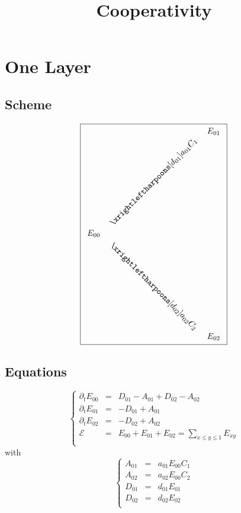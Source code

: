 \documentclass[aps,onecolumn,12pt]{revtex4}
\begin{document}
\title{Cooperativity}
\maketitle

\section{One Layer}

\subsection{Scheme}
\begin{equation}
\boxed{
\begin{array}{ccc}
 & & E_{01} \\
 &  \rotatebox{45}{$\xrightleftharpoons[d_{01}]{a_{01}C_1}$} &     \\
E_{00} & & \\
  & \rotatebox{-45}{$\xrightleftharpoons[d_{02}]{a_{02}C_2}$} &     \\
 & & E_{02} \\
 \end{array}
 }
\end{equation}

\subsection{Equations}

\begin{equation}
\left\lbrace
\begin{array}{rcl}
\partial_t E_{00} & = & D_{01}-A_{01} + D_{02}-A_{02}\\
\partial_t E_{01} & = & -D_{01}+A_{01}\\
\partial_t E_{02} & = & -D_{02}+A_{02}\\
\mathcal{E}       & = & E_{00}+E_{01}+E_{02} = {\displaystyle \sum_{x\leq y\leq 1} E_{xy}}\\
\end{array}
\right.
\end{equation}
with
\begin{equation}
\left\lbrace
\begin{array}{rcl}
A_{01} &= &a_{01} E_{00} C_1\\
A_{02} &= &a_{02} E_{00} C_2\\
D_{01} &= &d_{01} E_{01}\\
D_{02} &= &d_{02} E_{02}\\
\end{array}
\right.
\end{equation}
\end{document}
